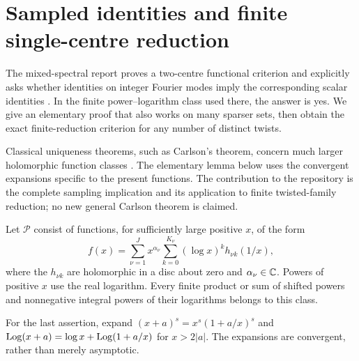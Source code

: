 \section{Sampled identities and finite single-centre reduction}
\label{sampling:section}

The mixed-spectral report proves a two-centre functional criterion and
explicitly asks whether identities on integer Fourier modes imply the
corresponding scalar identities \cite[Section 6, question on sampled
identities]{RepoMixed}. In the finite power--logarithm class used there,
the answer is yes. We give an elementary proof that also works on many
sparser sets, then obtain the exact finite-reduction criterion for any
number of distinct twists.

Classical uniqueness theorems, such as Carlson's theorem, concern much
larger holomorphic function classes \cite{Pila}. The elementary lemma
below uses the convergent expansions specific to the present functions.
The contribution to the repository is the complete sampling implication
and its application to finite twisted-family reduction; no new general
Carlson theorem is claimed.

\begin{definition}
\label{sampling:class}
Let $\mathscr P$ consist of functions, for sufficiently large positive
$x$, of the form
\begin{equation}\label{sampling:germ}
 f(x)=\sum_{\nu=1}^J x^{\alpha_\nu}
           \sum_{k=0}^{K_\nu}(\log x)^k h_{\nu k}(1/x),
\end{equation}
where the $h_{\nu k}$ are holomorphic in a disc about zero and
$\alpha_\nu\in\mathbb C$. Powers of positive $x$ use the real logarithm.
Every finite product or sum of shifted powers and nonnegative integral
powers of their logarithms belongs to this class.
\end{definition}

For the last assertion, expand
$(x+a)^s=x^s(1+a/x)^s$ and
$\operatorname{Log}(x+a)=\log x+\operatorname{Log}(1+a/x)$ for $x>2|a|$.
The expansions are convergent, rather than merely asymptotic.

